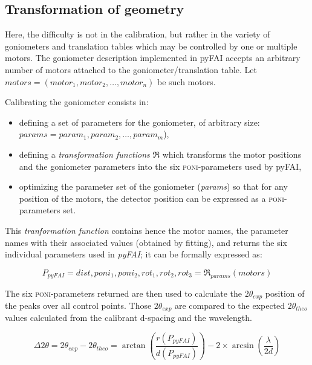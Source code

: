 \documentclass[preprint]{iucr}              %
\begin{document}
\subsection{Transformation of geometry}

Here, the difficulty is not in the calibration, but rather in the
variety of goniometers and translation tables which may be controlled by one or 
multiple motors.
The goniometer description implemented in pyFAI accepts an
arbitrary number of motors attached to the goniometer/translation table. 
Let $motors = (motor_1, motor_2, \ldots, motor_n)$ be such motors. 

Calibrating the goniometer consists in:
\begin{itemize}
  \item defining a set of parameters for the goniometer, of arbitrary size:
  $params = param_1, param_2, \ldots, param_m$),
  \item defining a \textit{transformation functions} $\Re$ which transforms the motor positions
  and the goniometer parameters into the six \textsc{poni}-parameters used by
  pyFAI,
  \item optimizing the parameter set of the goniometer (\textit{params}) so that
  for any position of the motors, the detector position can be expressed as
  a \textsc{poni}-parameters set.
\end{itemize}

This \textit{tranformation function} contains hence the motor names, the
parameter names with their associated values (obtained by fitting), and returns
the six individual parameters used in \textit{pyFAI}; it can be formally
expressed as:

\begin{equation}
P_{pyFAI} = dist, poni_1, poni_2, rot_1, rot_2, rot_3 = \Re_{params}(motors)
\end{equation}


The six \textsc{poni}-parameters returned 
are then used to
calculate the $2\theta_{exp}$ position of the peaks over all control
points.
Those $2\theta_{exp}$ are compared to
the expected $2\theta_{theo}$ values calculated from the calibrant d-spacing and
the wavelength.

$$
\Delta 2\theta = 2\theta _{exp} - 2\theta _{theo} =
\arctan(\frac{r(P_{pyFAI})}{d(P_{pyFAI})}) -  2 \times
\arcsin(\frac{\lambda}{2d})
$$
\end{document}
